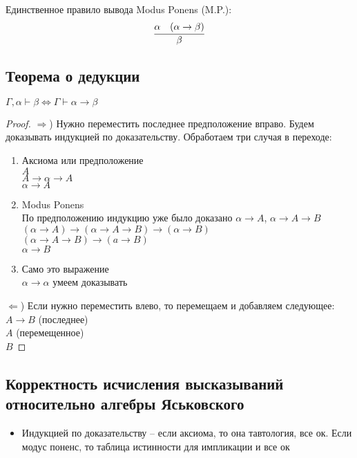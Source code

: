 Единственное правило вывода Modus Ponens (M.P.):
\[\infer{\beta}{\alpha & (\alpha \rightarrow \beta)}\]
\subsection{Теорема о дедукции}
\label{sec-3-4}
\begin{theorem}
	$\Gamma, \alpha \vdash \beta \Leftrightarrow \Gamma \vdash \alpha \to \beta$
\end{theorem}
\begin{proof}
\leavevmode
$\Rightarrow$)
Нужно переместить последнее предположение вправо.
Будем доказывать индукцией по доказательству. Обработаем три случая в переходе:
\begin{enumerate}
\item Аксиома или предположение \\
$A$ \\
$A\to \alpha \to A$ \\
$\alpha \to A$
\item Modus Ponens \\
По предположению индукцию уже было доказано $\alpha \to A$, $\alpha \to A \to B$ \\
$(\alpha \to A)\to (\alpha \to A \to B)\to (\alpha \to B)$ \\
$(\alpha \to A\to B)\to (a\to B)$ \\
$\alpha \to B$
\item Само это выражение \\
$\alpha\to \alpha$ умеем доказывать
\end{enumerate}
$\Leftarrow$) Если нужно переместить влево, то перемещаем и добавляем следующее: \\
$A\to B$ (последнее) \\
$A$    (перемещенное) \\
$B$
\end{proof}

\subsection{Корректность исчисления высказываний относительно алгебры Яськовского}
\label{sec-3-5}
\begin{itemize}
\item Индукцией по доказательству -- если аксиома, то она
тавтология, все ок. Если модус поненс, то таблица
истинности для импликации и все ок
\end{itemize}

